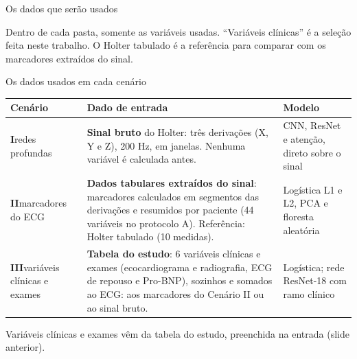 \documentclass[10pt,aspectratio=169]{beamer}
\newcommand{\fonte}[1]{\par\vfill{\scriptsize\color{cinza}#1}}
\begin{document}
\begin{frame}{Os dados que serão usados}

  \vspace{0mm}
  {\scriptsize\color{cinza} Dentro de cada pasta, somente as variáveis usadas. ``Variáveis clínicas'' é a seleção feita neste trabalho. O Holter tabulado é a referência para comparar com os marcadores extraídos do sinal.\par}
\end{frame}

\begin{frame}{Os dados usados em cada cenário}
  \centering
  \footnotesize
  \setlength{\tabcolsep}{4pt}
  \renewcommand{\arraystretch}{1.25}
  \begin{tabular}{>{\raggedright\arraybackslash}p{2.3cm}>{\raggedright\arraybackslash}p{6.3cm}>{\raggedright\arraybackslash}p{3.6cm}}
    \toprule
    \textbf{Cenário} & \textbf{Dado de entrada} & \textbf{Modelo} \\
    \midrule
    \textbf{I}\newline redes profundas &
      \textbf{Sinal bruto} do Holter: três derivações (X, Y e Z), 200 Hz, em janelas. Nenhuma variável é calculada antes. &
      CNN, ResNet e atenção, direto sobre o sinal \\
    \midrule
    \textbf{II}\newline marcadores do ECG &
      \textbf{Dados tabulares extraídos do sinal}: marcadores calculados em segmentos das derivações e resumidos por paciente (44 variáveis no protocolo A). Referência: Holter tabulado (10 medidas). &
      Logística L1 e L2, PCA e floresta aleatória \\
    \midrule
    \textbf{III}\newline variáveis clínicas e exames &
      \textbf{Tabela do estudo}: 6 variáveis clínicas e exames (ecocardiograma e radiografia, ECG de repouso e Pro-BNP), sozinhos e somados ao ECG: aos marcadores do Cenário II ou ao sinal bruto. &
      Logística; rede ResNet-18 com ramo clínico \\
    \bottomrule
  \end{tabular}
  \fonte{Variáveis clínicas e exames vêm da tabela do estudo, preenchida na entrada (slide anterior).}
\end{frame}
\end{document}
